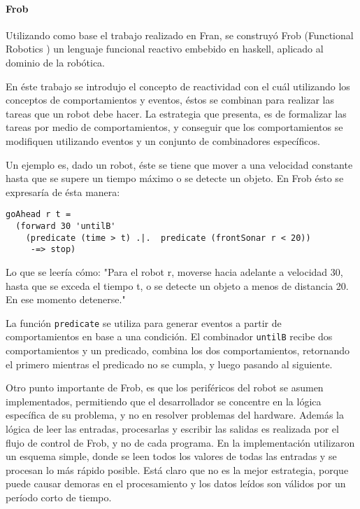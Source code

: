 \paragraph{Frob}

  Utilizando como base el trabajo realizado en Fran, se construyó Frob
(Functional Robotics \cite{petersonhudakelliot99:lambdainmotion}
\cite{petersonhagerhudak99:frob})
un lenguaje funcional reactivo embebido en haskell, aplicado al
dominio de la robótica.
  
  En éste trabajo se introdujo el concepto de reactividad con el cuál
utilizando los conceptos de comportamientos y eventos, éstos se combinan
para realizar las tareas que un robot debe hacer.
  La estrategia que presenta, es de formalizar las tareas por medio de
comportamientos, y conseguir que los comportamientos se modifiquen
utilizando eventos y un conjunto de combinadores específicos.

  Un ejemplo es, dado un robot, éste se tiene que mover a una velocidad
constante hasta que se supere un tiempo máximo o se detecte un objeto.
  En Frob ésto se expresaría de ésta manera:

\begin{verbatim}
goAhead r t =
  (forward 30 'untilB'
    (predicate (time > t) .|.  predicate (frontSonar r < 20))
     -=> stop)
\end{verbatim}

  Lo que se leería cómo: "Para el robot r, moverse hacia adelante a
velocidad 30, hasta que se exceda el tiempo t, o se detecte un objeto
a menos de distancia 20. En ese momento detenerse."

  La función \texttt{predicate} se utiliza para generar eventos a partir
de comportamientos en base a una condición.
  El combinador \texttt{untilB} recibe dos comportamientos y un predicado,
combina los dos comportamientos, retornando el primero mientras el predicado
no se cumpla, y luego pasando al siguiente.
  
  Otro punto importante de Frob, es que los periféricos del robot se
asumen implementados, permitiendo que el desarrollador se concentre
en la lógica específica de su problema, y no en resolver problemas
del hardware.
  Además la lógica de leer las entradas, procesarlas y escribir las salidas
es realizada por el flujo de control de Frob, y no de cada programa.
  En la implementación utilizaron un esquema simple, donde se leen todos
los valores de todas las entradas y se procesan lo más rápido posible.
  Está claro que no es la mejor estrategia, porque puede causar demoras
en el procesamiento y los datos leídos son válidos por un
período corto de tiempo.


